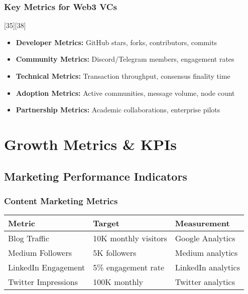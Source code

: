 \documentclass[12pt,a4paper]{article}
\begin{document}
\subsubsection{Key Metrics for Web3 VCs}[35][38]
\begin{itemize}
    \item \textbf{Developer Metrics:} GitHub stars, forks, contributors, commits
    \item \textbf{Community Metrics:} Discord/Telegram members, engagement rates
    \item \textbf{Technical Metrics:} Transaction throughput, consensus finality time
    \item \textbf{Adoption Metrics:} Active communities, message volume, node count
    \item \textbf{Partnership Metrics:} Academic collaborations, enterprise pilots
\end{itemize}

\section{Growth Metrics \& KPIs}

\subsection{Marketing Performance Indicators}

\subsubsection{Content Marketing Metrics}
\begin{center}
\begin{tabular}{|l|l|l|}
\hline
\textbf{Metric} & \textbf{Target} & \textbf{Measurement} \\
\hline
Blog Traffic & 10K monthly visitors & Google Analytics \\
Medium Followers & 5K followers & Medium analytics \\
LinkedIn Engagement & 5\% engagement rate & LinkedIn analytics \\
Twitter Impressions & 100K monthly & Twitter analytics \\
\hline
\end{tabular}
\end{center}
\end{document}
